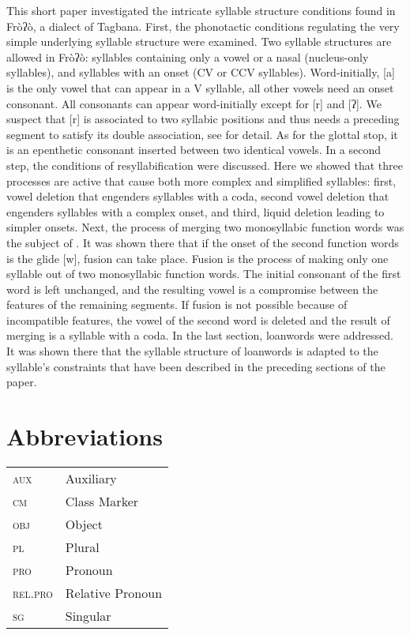 \documentclass[output=paper]{langscibook}
\begin{document}
This short paper investigated the intricate syllable structure conditions found in Fròʔò, a dialect of Tagbana. First, the phonotactic conditions regulating the very simple underlying syllable structure were examined. Two syllable structures are allowed in Fròʔò: syllables containing only a vowel or a nasal (nucleus-only syllables), and syllables with an onset (CV or CCV syllables). Word-initially, [a] is the only vowel that can appear in a V syllable, all other vowels need an onset consonant. All consonants can appear word-initially except for [r] and [ʔ]. We suspect that [r] is associated to two syllabic positions and thus needs a preceding segment to satisfy its double association, see \cite{FanselowTBA} for detail. As for the glottal stop, it is an epenthetic consonant inserted between two identical vowels. In a second step, the conditions of resyllabification were discussed. Here we showed that three processes are active that cause both more complex and simplified syllables: first, vowel deletion that engenders syllables with a coda, second vowel deletion that engenders syllables with a complex onset, and third, liquid deletion leading to simpler onsets. Next, the process of merging two monosyllabic function words was the subject of . It was shown there that if the onset of the second function words is the glide [w], fusion can take place. Fusion is the process of making only one syllable out of two monosyllabic function words. The initial consonant of the first word is left unchanged, and the resulting vowel is a compromise between the features of the remaining segments. If fusion is not possible because of incompatible features, the vowel of the second word is deleted and the result of merging is a syllable with a coda. In the last section, loanwords were addressed. It was shown there that the syllable structure of loanwords is adapted to the syllable’s constraints that have been described in the preceding sections of the paper.  

\section*{Abbreviations}
\noindent\begin{tabularx}{.8\textwidth}{@{}>{\scshape}lQ@{}}
aux & Auxiliary\\
cm & Class Marker\\
obj & Object\\
pl & Plural\\
pro & Pronoun\\
rel.pro & Relative Pronoun\\
sg & Singular\\
\end{tabularx}
\end{document}
